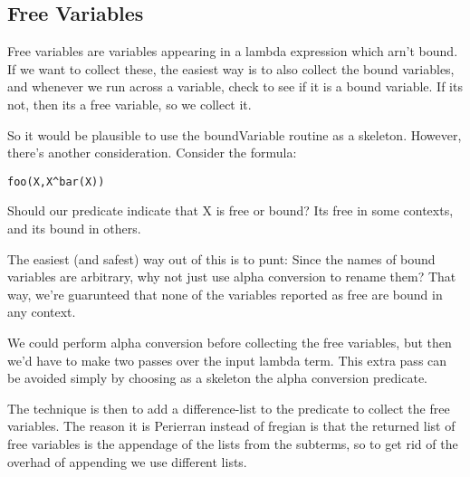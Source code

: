 \documentclass{book}[9pt]
\begin{document}
\subsection{Free Variables}

Free variables are variables appearing in a lambda expression which
arn't bound.  If we want to collect these, the easiest way is to also
collect the bound variables, and whenever we run across a variable,
check to see if it is a bound variable.  If its not, then its a free
variable, so we collect it.

So it would be plausible to use the boundVariable routine as a skeleton.
However, there's another consideration.  Consider the formula:
\begin{verbatim}
foo(X,X^bar(X))
\end{verbatim}
\noindent Should our predicate indicate that X is free or bound?
Its free in some contexts, and its bound in others.

The easiest (and safest) way out of this is to punt: Since the names
of bound variables are arbitrary, why not just use alpha conversion to
rename them?  That way, we're guarunteed that none of the variables
reported as free are bound in any context.

We could perform alpha conversion before collecting the free
variables, but then we'd have to make two passes over the input lambda
term.  This extra pass can be avoided simply by choosing as a skeleton
the alpha conversion predicate.

The technique is then to add a difference-list to the predicate to
collect the free variables.  The reason it is Perierran instead of
fregian is that the returned list of free variables is the appendage
of the lists from the subterms, so to get rid of the overhad of
appending we use different lists.
\end{document}
